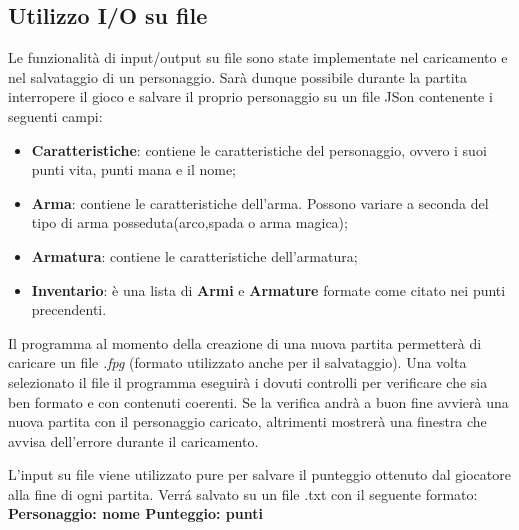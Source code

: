 \documentclass[../relazione.tex]{subfiles}
\begin{document}
\subsection{Utilizzo I/O su file}
\label{ssec:i-o-file}
Le funzionalità di input/output su file sono state implementate nel caricamento e nel salvataggio di un personaggio.
Sarà dunque possibile durante la partita interropere il gioco e salvare il proprio personaggio su un file JSon contenente i seguenti campi:
\begin{itemize}
    \item \textbf{Caratteristiche}: contiene le caratteristiche del personaggio, ovvero i suoi punti vita, punti mana e il nome;
    \item \textbf{Arma}: contiene le caratteristiche dell'arma. Possono variare a seconda del tipo di arma posseduta(arco,spada o arma magica);
    \item \textbf{Armatura}: contiene le caratteristiche dell'armatura;
    \item \textbf{Inventario}: è una lista di \textbf{Armi} e \textbf{Armature} formate come citato nei punti precendenti.
\end{itemize}

Il programma al momento della creazione di una nuova partita permetterà di caricare un file \textit{.fpg} (formato utilizzato anche per il salvataggio).
Una volta selezionato il file il programma eseguirà i dovuti controlli per verificare che sia ben formato e con contenuti coerenti.
Se la verifica andrà a buon fine avvierà una nuova partita con il personaggio caricato, altrimenti mostrerà una finestra che avvisa dell'errore durante il caricamento.

L'input su file viene utilizzato pure per salvare il punteggio ottenuto dal giocatore alla fine di ogni partita.
Verrá salvato su un file .txt con il seguente formato:\\ 
\textbf{Personaggio: nome   Punteggio: punti}
\end{document}
